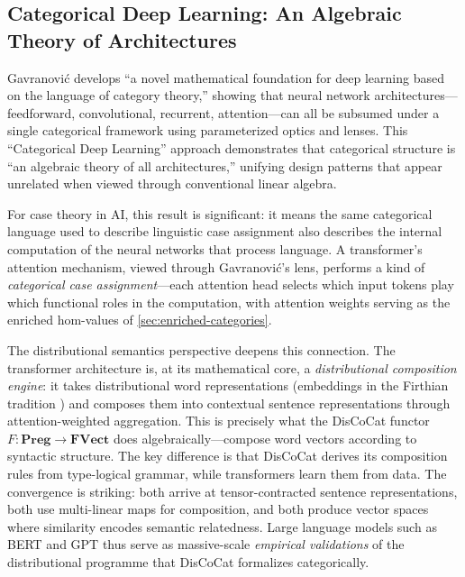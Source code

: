 \documentclass[
]{article}
\numberwithin{equation}{section}
\begin{document}
\subsection{Categorical Deep Learning: An Algebraic Theory of
Architectures}\label{categorical-deep-learning-an-algebraic-theory-of-architectures}

Gavranović \citeyearpar{gavranovic2024thesis} develops ``a novel
mathematical foundation for deep learning based on the language of
category theory,'' showing that neural network
architectures---feedforward, convolutional, recurrent, attention---can
all be subsumed under a single categorical framework using parameterized
optics and lenses. This ``Categorical Deep Learning'' approach
\citep{shiebler2024categorical} demonstrates that categorical structure
is ``an algebraic theory of all architectures,'' unifying design
patterns that appear unrelated when viewed through conventional linear
algebra.

For case theory in AI, this result is significant: it means the same
categorical language used to describe linguistic case assignment also
describes the internal computation of the neural networks that process
language. A transformer's attention mechanism, viewed through
Gavranović's lens, performs a kind of \emph{categorical case
assignment}---each attention head selects which input tokens play which
functional roles in the computation, with attention weights serving as
the enriched hom-values of \autoref{sec:enriched-categories}.

The distributional semantics perspective deepens this connection. The
transformer architecture \citep{vaswani2017attention} is, at its
mathematical core, a \emph{distributional composition engine}: it takes
distributional word representations (embeddings in the Firthian
tradition \citep{firth1957papers}) and composes them into contextual
sentence representations through attention-weighted aggregation. This is
precisely what the DisCoCat functor
\(F: \mathbf{Preg} \to \mathbf{FVect}\) does algebraically---compose
word vectors according to syntactic structure. The key difference is
that DisCoCat derives its composition rules from type-logical grammar,
while transformers learn them from data. The convergence is striking:
both arrive at tensor-contracted sentence representations, both use
multi-linear maps for composition, and both produce vector spaces where
similarity encodes semantic relatedness. Large language models such as
BERT \citep{devlin2019bert} and GPT \citep{radford2018improving} thus
serve as massive-scale \emph{empirical validations} of the
distributional programme that DisCoCat formalizes categorically.
\end{document}
